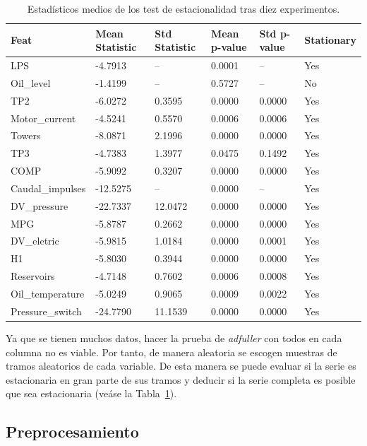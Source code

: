 \documentclass[12pt,letterpaper]{article}
\begin{document}
\begin{table}[htp]
    \centering
    \begin{tabular}{llllll}
        \hline
        Feat & Mean Statistic & Std Statistic & Mean p-value & Std p-value & Stationary \\
        \hline
        LPS & -4.7913 & -- & 0.0001 & -- & Yes \\
        Oil\_level & -1.4199 & -- & 0.5727 & -- & No \\
        TP2 & -6.0272 & 0.3595 & 0.0000 & 0.0000 & Yes \\
        Motor\_current & -4.5241 & 0.5570 & 0.0006 & 0.0006 & Yes \\
        Towers & -8.0871 & 2.1996 & 0.0000 & 0.0000 & Yes \\
        TP3 & -4.7383 & 1.3977 & 0.0475 & 0.1492 & Yes \\
        COMP & -5.9092 & 0.3207 & 0.0000 & 0.0000 & Yes \\
        Caudal\_impulses & -12.5275 & -- & 0.0000 & -- & Yes \\
        DV\_pressure & -22.7337 & 12.0472 & 0.0000 & 0.0000 & Yes \\
        MPG & -5.8787 & 0.2662 & 0.0000 & 0.0000 & Yes \\
        DV\_eletric & -5.9815 & 1.0184 & 0.0000 & 0.0001 & Yes \\
        H1 & -5.8030 & 0.3944 & 0.0000 & 0.0000 & Yes \\
        Reservoirs & -4.7148 & 0.7602 & 0.0006 & 0.0008 & Yes \\
        Oil\_temperature & -5.0249 & 0.9065 & 0.0009 & 0.0022 & Yes \\
        Pressure\_switch & -24.7790 & 11.1539 & 0.0000 & 0.0000 & Yes \\
        \hline
        \end{tabular}
        \caption{Estadísticos medios de los test de estacionalidad tras diez experimentos.}
        \label{tab:stationary_results}
\end{table}

Ya que se tienen muchos datos, hacer la prueba de \textit{adfuller} con todos en cada columna no es viable. Por tanto, de manera aleatoria se escogen muestras de tramos aleatorios de cada variable. De esta manera se puede evaluar si la serie es estacionaria en gran parte de sus tramos y deducir si la serie completa es posible que sea estacionaria (veáse la Tabla~\ref{tab:stationary_results}).


\subsection{Preprocesamiento}
\end{document}
